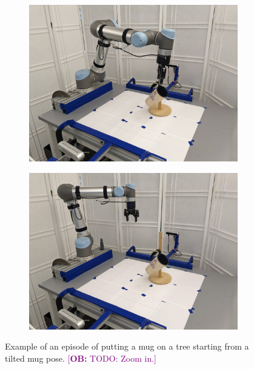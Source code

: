 \documentclass{article}
\newcommand{\ob}[1]{\textcolor{purple}{[\textbf{OB:} #1]}}
\begin{document}
\begin{figure}[]
\begin{subfigure}{(\linewidth - 0.05\linewidth)/5}
        \includegraphics[width=\linewidth]{figures/episodes/mug_on_tree/9.jpg}
    \end{subfigure}
    \begin{subfigure}{(\linewidth - 0.05\linewidth)/5}
        \centering
        \includegraphics[width=\linewidth]{figures/episodes/mug_on_tree/10.jpg}
    \end{subfigure}

    \caption{Example of an episode of putting a mug on a tree starting from a tilted mug pose. \ob{TODO: Zoom in.}}
    \label{fig:mug_tree_episode}
\end{figure}
\end{document}
